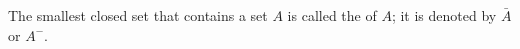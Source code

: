 The smallest closed set that contains a set $A$ is called the  of $A$; it is denoted by $\bar{A}$ or $A^{-}$.
